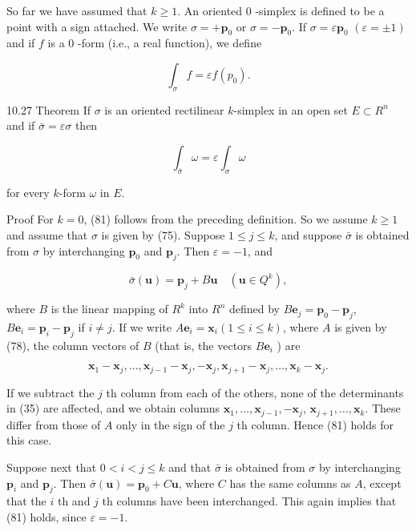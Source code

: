 \documentclass[10pt]{article}
\begin{document}
So far we have assumed that $k \geq 1$. An oriented 0 -simplex is defined to be a point with a sign attached. We write $\sigma=+\mathbf{p}_{0}$ or $\sigma=-\mathbf{p}_{0}$. If $\sigma=\varepsilon \mathbf{p}_{0}$ $(\varepsilon= \pm 1)$ and if $f$ is a 0 -form (i.e., a real function), we define

$$
\int_{\sigma} f=\varepsilon f\left(p_{0}\right) .
$$

10.27 Theorem If $\sigma$ is an oriented rectilinear $k$-simplex in an open set $E \subset R^{n}$ and if $\bar{\sigma}=\varepsilon \sigma$ then

$$
\int_{\bar{\sigma}} \omega=\varepsilon \int_{\sigma} \omega
$$

for every $k$-form $\omega$ in $E$.

Proof For $k=0$, (81) follows from the preceding definition. So we assume $k \geq 1$ and assume that $\sigma$ is given by (75). Suppose $1 \leq j \leq k$, and suppose $\bar{\sigma}$ is obtained from $\sigma$ by interchanging $\mathbf{p}_{0}$ and $\mathbf{p}_{j}$. Then $\varepsilon=-1$, and

$$
\bar{\sigma}(\mathbf{u})=\mathbf{p}_{j}+B \mathbf{u} \quad\left(\mathbf{u} \in Q^{k}\right),
$$

where $B$ is the linear mapping of $R^{k}$ into $R^{n}$ defined by $B \mathbf{e}_{j}=\mathbf{p}_{0}-\mathbf{p}_{j}$, $B \mathbf{e}_{i}=\mathbf{p}_{i}-\mathbf{p}_{j}$ if $i \neq j$. If we write $A \mathbf{e}_{i}=\mathbf{x}_{i}(1 \leq i \leq k)$, where $A$ is given by (78), the column vectors of $B$ (that is, the vectors $B \mathbf{e}_{i}$ ) are

$$
\mathbf{x}_{1}-\mathbf{x}_{j}, \ldots, \mathbf{x}_{j-1}-\mathbf{x}_{j},-\mathbf{x}_{j}, \mathbf{x}_{j+1}-\mathbf{x}_{j}, \ldots, \mathbf{x}_{k}-\mathbf{x}_{j} .
$$

If we subtract the $j$ th column from each of the others, none of the determinants in (35) are affected, and we obtain columns $\mathbf{x}_{1}, \ldots, \mathbf{x}_{j-1},-\mathbf{x}_{j}$, $\mathbf{x}_{j+1}, \ldots, \mathbf{x}_{k}$. These differ from those of $A$ only in the sign of the $j$ th column. Hence (81) holds for this case.

Suppose next that $0<i<j \leq k$ and that $\bar{\sigma}$ is obtained from $\sigma$ by interchanging $\mathbf{p}_{i}$ and $\mathbf{p}_{j}$. Then $\bar{\sigma}(\mathbf{u})=\mathbf{p}_{0}+C \mathbf{u}$, where $C$ has the same columns as $A$, except that the $i$ th and $j$ th columns have been interchanged. This again implies that (81) holds, since $\varepsilon=-1$.
\end{document}
